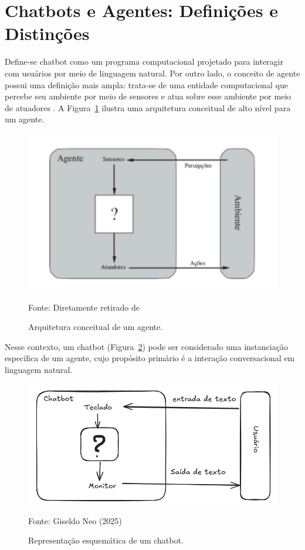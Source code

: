 \documentclass[14pt,a4paper,oneside]{book}
\begin{document}


\section{Chatbots e Agentes: Definições e Distinções}

Define-se chatbot como um programa computacional projetado para interagir com usuários por meio de linguagem natural. Por outro lado, o conceito de agente possui uma definição mais ampla: trata-se de uma entidade computacional que percebe seu ambiente por meio de sensores e atua sobre esse ambiente por meio de atuadores \cite{Russel2013}. A Figura~\ref{fig:agente} ilustra uma arquitetura conceitual de alto nível para um agente.

\begin{figure}
	\centering
	\caption{Arquitetura conceitual de um agente.}
	\includegraphics[width=0.7\linewidth]{fig/ia.png}
	\label{fig:agente}
	{\footnotesize \centering

		Fonte: Diretamente retirado de \cite{Russel2013}}
\end{figure}

Nesse contexto, um chatbot (Figura~\ref{fig:chatbot}) pode ser considerado uma instanciação específica de um agente, cujo propósito primário é a interação conversacional em linguagem natural.

\begin{figure}
	\centering
	\caption{Representação esquemática de um chatbot.}
	\includegraphics[width=0.9\linewidth]{fig/chatbot.png}
	\label{fig:chatbot}
	{\footnotesize \centering

		Fonte: Giseldo Neo (2025)}
\end{figure}
\end{document}
